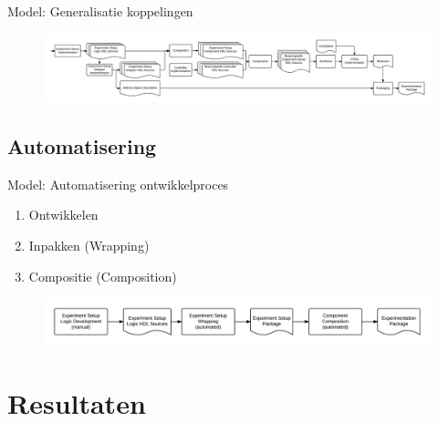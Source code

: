\documentclass{beamer}
\begin{document}
\begin{frame}{Model: Generalisatie koppelingen}
\begin{figure}[h]
    \centering
    \includegraphics[width=\textwidth]{img/processes-abstract-development}
\end{figure}
\end{frame}


\subsection{Automatisering}
\begin{frame}{Model: Automatisering ontwikkelproces}
\begin{enumerate}
    \item Ontwikkelen
    \item Inpakken (Wrapping)
    \item Compositie (Composition)
\end{enumerate}

\begin{figure}[h]
    \centering
    \includegraphics[width=\textwidth]{img/processes-abstract-automation-overview}
\end{figure}

\end{frame}



\section{Resultaten}
\end{document}
